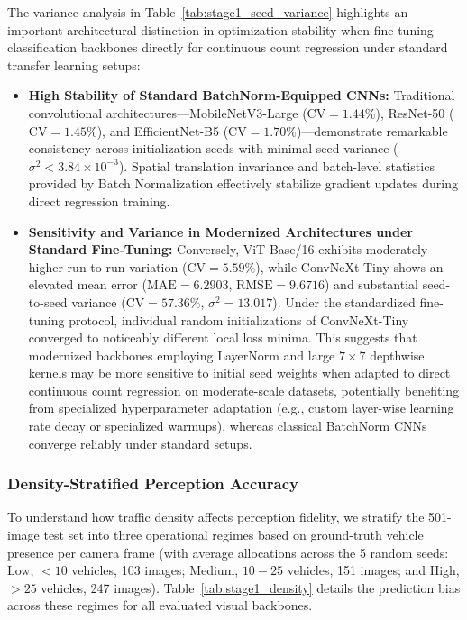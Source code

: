 \documentclass[preprint,12pt]{elsarticle}
\begin{document}
The variance analysis in Table~\ref{tab:stage1_seed_variance} highlights an important architectural distinction in optimization stability when fine-tuning classification backbones directly for continuous count regression under standard transfer learning setups:
\begin{itemize}
    \item \textbf{High Stability of Standard BatchNorm-Equipped CNNs:} Traditional convolutional architectures---MobileNetV3-Large ($\text{CV} = 1.44\%$), ResNet-50 ($\text{CV} = 1.45\%$), and EfficientNet-B5 ($\text{CV} = 1.70\%$)---demonstrate remarkable consistency across initialization seeds with minimal seed variance ($\sigma^2 < 3.84 \times 10^{-3}$). Spatial translation invariance and batch-level statistics provided by Batch Normalization effectively stabilize gradient updates during direct regression training.
    \item \textbf{Sensitivity and Variance in Modernized Architectures under Standard Fine-Tuning:} Conversely, ViT-Base/16 exhibits moderately higher run-to-run variation ($\text{CV} = 5.59\%$), while ConvNeXt-Tiny shows an elevated mean error ($\text{MAE} = 6.2903$, $\text{RMSE} = 9.6716$) and substantial seed-to-seed variance ($\text{CV} = 57.36\%$, $\sigma^2 = 13.017$). Under the standardized fine-tuning protocol, individual random initializations of ConvNeXt-Tiny converged to noticeably different local loss minima. This suggests that modernized backbones employing LayerNorm and large $7 \times 7$ depthwise kernels may be more sensitive to initial seed weights when adapted to direct continuous count regression on moderate-scale datasets, potentially benefiting from specialized hyperparameter adaptation (e.g., custom layer-wise learning rate decay or specialized warmups), whereas classical BatchNorm CNNs converge reliably under standard setups.
\end{itemize}

\subsubsection{Density-Stratified Perception Accuracy}
To understand how traffic density affects perception fidelity, we stratify the 501-image test set into three operational regimes based on ground-truth vehicle presence per camera frame (with average allocations across the 5 random seeds: Low, $<10$ vehicles, 103 images; Medium, $10-25$ vehicles, 151 images; and High, $>25$ vehicles, 247 images). Table~\ref{tab:stage1_density} details the prediction bias across these regimes for all evaluated visual backbones.
\end{document}
